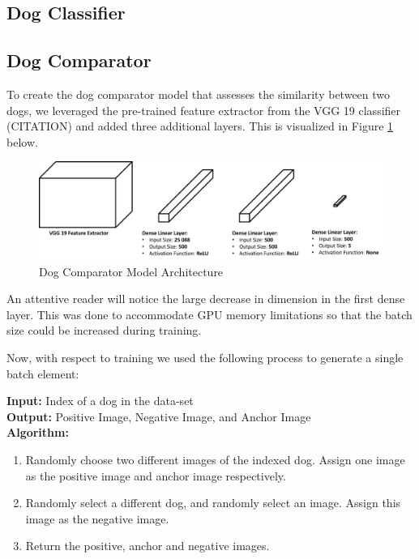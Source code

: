 \documentclass{article}
\begin{document}
\subsection{Dog Classifier}

\subsection{Dog Comparator}
To create the dog comparator model that assesses the similarity between two dogs, we leveraged the pre-trained feature extractor from the VGG 19 classifier (CITATION) and added three additional layers.  This is visualized in Figure \ref{fig:x comparator} below.

\begin{figure}[h]
\centering
	\includegraphics[scale=0.4]{final-report-images/dog_comparator.png}
\caption{Dog Comparator Model Architecture}
\label{fig:x comparator}
\end{figure}

\noindent An attentive reader will notice the large decrease in dimension in the first dense layer.  This was done to accommodate GPU memory limitations so that the batch size could be increased during training.   

Now, with respect to training we used the following process to generate a single batch element: \\

\begin{minipage}{1\textwidth}%
  \noindent \textbf{Input:} Index of a dog in the data-set \\
  
  \noindent \textbf{Output:} Positive Image, Negative Image, and Anchor Image \\
  
  \noindent \textbf{Algorithm:} \\
\end{minipage}%

\begin{enumerate}

  \item Randomly choose two different images of the indexed dog.  Assign one image as the positive image and anchor image respectively. 

  \item Randomly select a different dog, and randomly select an image.  Assign this image as the negative image.
  
  \item Return the positive, anchor and negative images.

\end{enumerate}
\end{document}
